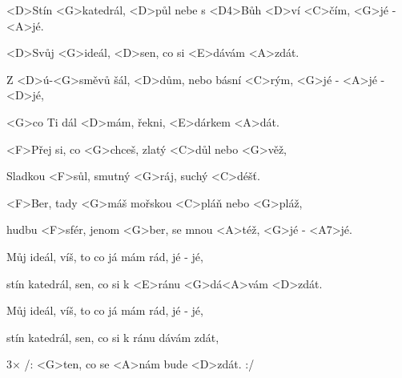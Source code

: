 

\zs
<D>Stín <G>katedrál, <D>půl nebe s <D4>Bůh <D>ví <C>čím, <G>jé - <A>jé.

<D>Svůj <G>ideál, <D>sen, co si <E>dávám <A>zdát.

Z <D>ú-<G>směvů šál, <D>dům, nebo básní <C>rým, <G>jé - <A>jé - <D>jé,

<G>co Ti dál <D>mám, řekni, <E>dárkem <A>dát.
\ks

\zr
<F>Přej si, co <G>chceš, zlatý <C>důl nebo <G>věž,

Sladkou <F>sůl, smutný <G>ráj, suchý <C>déšť.

<F>Ber, tady <G>máš mořskou <C>pláň nebo <G>pláž,

hudbu <F>sfér, jenom <G>ber, se mnou <A>též, <G>jé - <A7>jé.
\kr

\zs
Můj ideál, víš, to co já mám rád, jé - jé,

stín katedrál, sen, co si k <E>ránu <G>dá<A>vám <D>zdát.
\ks

\zr\kr

\zs
Můj ideál, víš, to co já mám rád, jé - jé,

stín katedrál, sen, co si k ránu dávám zdát,

3× /: <G>ten, co se <A>nám bude <D>zdát. :/
\ks

\kp
